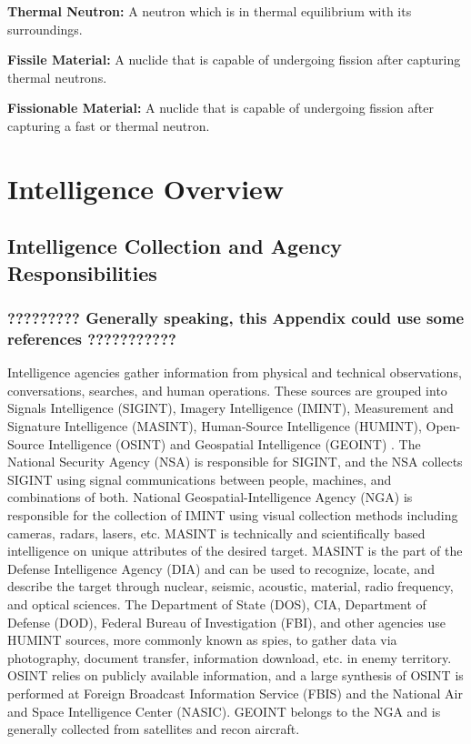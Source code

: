 \documentclass{report}
\begin{document}
\textbf{Thermal Neutron:} A neutron which is in thermal equilibrium with its surroundings. 

\textbf{Fissile Material:} A nuclide that is capable of undergoing fission after capturing thermal neutrons.

\textbf{Fissionable Material:} A nuclide that is capable of undergoing fission after capturing a fast or thermal neutron.




\chapter[Appendix B: Intelligence Overview]{Intelligence Overview}  \label{app:intel}


\section{Intelligence Collection and Agency Responsibilities}

\subsection{?????????  Generally speaking, this Appendix could use some references ???????????}

Intelligence agencies gather information from physical and technical observations, conversations, searches, and human operations. These sources are grouped into Signals Intelligence (SIGINT), Imagery Intelligence (IMINT), Measurement and Signature Intelligence (MASINT), Human-Source Intelligence (HUMINT), Open-Source Intelligence (OSINT) and Geospatial Intelligence (GEOINT) \cite{Intelligen}. The National Security Agency (NSA) is responsible for SIGINT, and the NSA collects SIGINT using signal communications between people, machines, and combinations of both. National Geospatial-Intelligence Agency (NGA) is responsible for the collection of IMINT using visual collection methods including cameras, radars, lasers, etc. MASINT is technically and scientifically based intelligence on unique attributes of the desired target. MASINT is the part of the Defense Intelligence Agency (DIA) and can be used to recognize, locate, and describe the target through nuclear, seismic, acoustic, material, radio frequency, and optical sciences. The Department of State (DOS), CIA, Department of Defense (DOD), Federal Bureau of Investigation (FBI), and other agencies use HUMINT sources, more commonly known as spies, to gather data via photography, document transfer, information download, etc. in enemy territory. OSINT relies on publicly available information, and a large synthesis of OSINT is performed at Foreign Broadcast Information Service (FBIS) and the National Air and Space Intelligence Center (NASIC). GEOINT belongs to the NGA and is generally collected from satellites and recon aircraft. 
\end{document}
